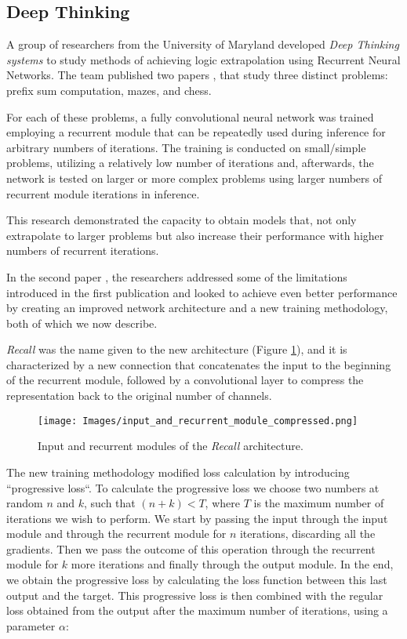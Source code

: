 \subsection{Deep Thinking}

A group of researchers from the University of Maryland developed \textit{Deep Thinking systems} to study methods of achieving logic extrapolation using Recurrent Neural Networks. The team published two papers \cite{deepthinking_2, easy_to_hard}, that study three distinct problems: prefix sum computation, mazes, and chess.

For each of these problems, a fully convolutional neural network was trained employing a recurrent module that can be repeatedly used during inference for arbitrary numbers of iterations. The training is conducted on small/simple problems, utilizing a relatively low number of iterations and, afterwards, the network is tested on larger or more complex problems using larger numbers of recurrent module iterations in inference.

This research demonstrated the capacity to obtain models that, not only extrapolate to larger problems but also increase their performance with higher numbers of recurrent iterations.

In the second paper \cite{deepthinking_2}, the researchers addressed some of the limitations introduced in the first publication \cite{easy_to_hard} and looked to achieve even better performance by creating an improved network architecture and a new training methodology, both of which we now describe.

\textit{Recall} was the name given to the new architecture (Figure \ref{input_and_recurrent_modules}), and it is characterized by a new connection that concatenates the input to the beginning of the recurrent module, followed by a convolutional layer to compress the representation back to the original number of channels.


\begin{figure}[h]
\begin{center}
\texttt{[image: Images/input\_and\_recurrent\_module\_compressed.png]}
\caption{Input and recurrent modules of the \textit{Recall} architecture.}\label{input_and_recurrent_modules}
\end{center}
\end{figure}

The new training methodology modified loss calculation by introducing ``progressive loss``. To calculate the progressive loss we choose two numbers at random $n$ and $k$, such that $ (n + k) < T$, where $T$ is the maximum number of iterations we wish to perform. We start by passing the input through the input module and through the recurrent module for $n$ iterations, discarding all the gradients. Then we pass the outcome of this operation through the recurrent module for $k$ more iterations and finally through the output module. In the end, we obtain the progressive loss by calculating the loss function between this last output and the target. This progressive loss is then combined with the regular loss obtained from the output after the maximum number of iterations, using a parameter $\alpha$:

